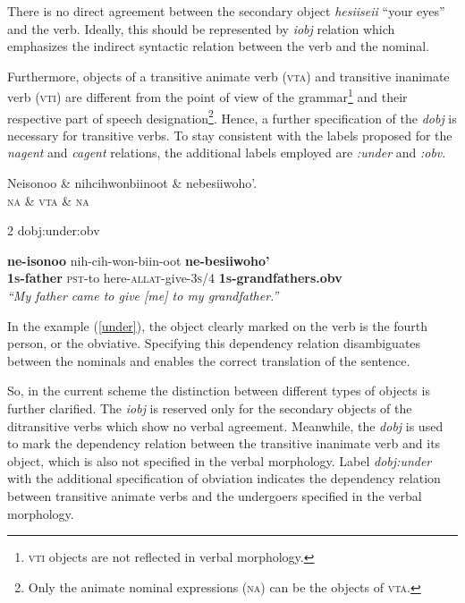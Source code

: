 \documentclass[11pt]{article}
\begin{document}
\normalsize
There is no direct agreement between the secondary object \textit{hesiiseii} ``your eyes'' and the verb. Ideally, this should be represented by \textit{iobj} relation which emphasizes the indirect syntactic relation between the verb and the nominal. 

Furthermore, objects of a transitive animate verb (\textsc{vta}) and transitive inanimate verb (\textsc{vti}) are different from the point of view of the grammar\footnote{\textsc{vti} objects are not reflected in verbal morphology.} and their respective part of speech designation\footnote{Only the animate nominal expressions (\textsc{na}) can be the objects of \textsc{vta}.}. Hence, a further specification of the \textit{dobj} is necessary for transitive verbs. To stay consistent with the labels proposed for the \textit{nagent} and \textit{cagent} relations, the additional labels employed are \textit{:under} and \textit{:obv}.

\small
\begin{exe}
\ex \label{under}
\begin{dependency}
\begin{deptext}
Neisonoo \& nihcihwonbiinoot \& nebesiiwoho'.\\
\textsc{na} \& \textsc{vta}	\& \textsc{na}\\
\end{deptext}
	{2}	{dobj:under:obv}
\end{dependency}
\gll \textbf{ne-isonoo} {nih-cih-won-biin-oot} \textbf{ne-besiiwoho'} \\
\textbf{\textsc{1s}-father} {\textsc{pst}-to here-\textsc{allat}-give-\textsc{3s/4}} \textbf{\textsc{1s}-grandfathers.obv}\\
\trans \textit{``My father came to give [me] to my grandfather.''}
\end{exe}
\normalsize
In the example (\ref{under}), the object clearly marked on the verb is the fourth person, or the obviative. Specifying this dependency relation disambiguates between the nominals and enables the correct translation of the sentence.

So, in the current scheme the distinction between different types of objects is further clarified. The \textit{iobj} is reserved only for the secondary objects of the ditransitive verbs which show no verbal agreement. Meanwhile, the \textit{dobj} is used to mark the dependency relation between the transitive inanimate verb and its object, which is also not specified in the verbal morphology. Label \textit{dobj:under} with the additional specification of obviation indicates the dependency relation between transitive animate verbs and the undergoers specified in the verbal morphology. 
\end{document}
